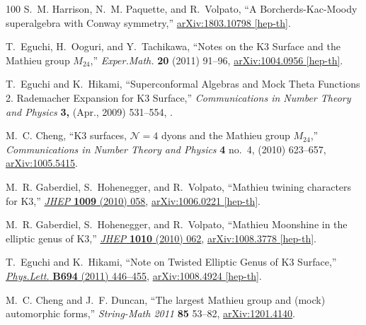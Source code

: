 \begin{thebibliography}{100}
S.~M. Harrison, N.~M. Paquette, and R.~Volpato, ``{A Borcherds-Kac-Moody
  superalgebra with Conway symmetry},''
\href{http://arxiv.org/abs/1803.10798}{{\ttfamily arXiv:1803.10798 [hep-th]}}.

T.~Eguchi, H.~Ooguri, and Y.~Tachikawa, ``{Notes on the K3 Surface and the
  Mathieu group $M_{24}$},'' {\em Exper.Math.} {\bfseries 20} (2011) 91--96,
\href{http://arxiv.org/abs/1004.0956}{{\ttfamily arXiv:1004.0956 [hep-th]}}.

T.~Eguchi and K.~Hikami, ``{Superconformal Algebras and Mock Theta Functions 2.
  Rademacher Expansion for K3 Surface},'' {\em Communications in Number Theory
  and Physics} {\bfseries 3,} (Apr., 2009) 531--554,
  \href{http://arxiv.org/abs/0904.0911}{{}}.

M.~C. Cheng, ``K3 surfaces, $\mathcal{N}= 4$ dyons and the {M}athieu group $
  {M_{24}} $,'' {\em Communications in Number Theory and Physics} {\bfseries 4}
  no.~4, (2010) 623--657,
  \href{http://arxiv.org/abs/arXiv:1005.5415}{{\ttfamily arXiv:1005.5415}}.

M.~R. Gaberdiel, S.~Hohenegger, and R.~Volpato, ``{Mathieu twining characters
  for K3},'' \href{http://dx.doi.org/10.1007/JHEP09(2010)058}{{\em JHEP}
  {\bfseries 1009} (2010) 058},
\href{http://arxiv.org/abs/1006.0221}{{\ttfamily arXiv:1006.0221 [hep-th]}}.

M.~R. Gaberdiel, S.~Hohenegger, and R.~Volpato, ``{Mathieu Moonshine in the
  elliptic genus of K3},''
  \href{http://dx.doi.org/10.1007/JHEP10(2010)062}{{\em JHEP} {\bfseries 1010}
  (2010) 062},
\href{http://arxiv.org/abs/1008.3778}{{\ttfamily arXiv:1008.3778 [hep-th]}}.

T.~Eguchi and K.~Hikami, ``{Note on Twisted Elliptic Genus of K3 Surface},''
  \href{http://dx.doi.org/10.1016/j.physletb.2010.10.017}{{\em Phys.Lett.}
  {\bfseries B694} (2011) 446--455},
\href{http://arxiv.org/abs/1008.4924}{{\ttfamily arXiv:1008.4924 [hep-th]}}.

M.~C. Cheng and J.~F. Duncan, ``The largest {M}athieu group and (mock)
  automorphic forms,'' {\em String-Math 2011} {\bfseries 85} 53--82,
  \href{http://arxiv.org/abs/arXiv:1201.4140}{{\ttfamily arXiv:1201.4140}}.


\end{thebibliography}
